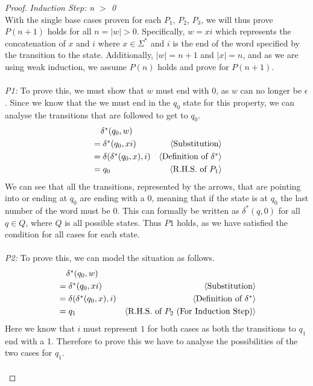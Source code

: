 \documentclass[11pt,fleqn]{article}
\newcommand{\mname}[1]{\mbox{\sf #1}}
\newcommand{\eps}{\epsilon}
\newcommand{\pnote}[1]{\langle \mbox{#1} \rangle}
\begin{document}
\begin{proof}
   \emph{Induction Step: n $>$ 0}\\
   With the single base cases proven for each $P_1$, $P_2$, $P_3$, we will thus prove $P(n+1)$ holds for all $n = |w| > 0$. Specifically, $w = xi$ which represents the concatenation of $x$ and $i$ where $x \in \Sigma^*$ and $i$ is the end of the word specified by the transition to the state. Additionally, $|w| = n + 1$ and $|x| = n$, and as we are using weak induction, we assume $P(n)$ holds and prove for $P(n+1)$. \\\\
   \emph{P1:}
   To prove this, we must show that $w$ must end with 0, as $w$ can no longer be $\eps$. Since we know that the we must end in the $q_0$ state for this property, we can analyse the transitions that are followed to get to $q_0$. 
   \begin{align*}
      &\phantom{{}=} \mname {$\delta^*(q_0, w)$}\\
      &= \mname{$\delta^*(q_0, xi)$} & \pnote{Substitution}\\
      &= \mname{$\delta(\delta^*(q_0, x), i)$} & \pnote{Definition of $\delta^*$}\\
      &= \mname{$q_0$} & \pnote{R.H.S. of $P_1$}
   \end{align*}
   We can see that all the transitions, represented by the arrows, that are pointing into or ending at $q_0$ are ending with a 0, meaning that if the state is at $q_0$ the last number of the word must be 0. This can formally be written as $\delta^*(q, 0)$ for all $q \in Q$, where $Q$ is all possible states. Thus $P1$ holds, as we have satisfied the condition for all cases for each state.
   \\\\
   \emph{P2:}
   To prove this, we can model the situation as follows.
   \begin{align*}
      &\phantom{{}=} \mname {$\delta^*(q_0, w)$}\\
      &= \mname{$\delta^*(q_0, xi)$}  & \pnote{Substitution}\\
      &= \mname{$\delta(\delta^*(q_0, x), i)$}  & \pnote{Definition of $\delta^*$}\\
      &= \mname{$q_1$} & \pnote{R.H.S. of $P_2$ (For Induction Step)}
   \end{align*}
   Here we know that $i$ must represent $1$ for both cases as both the transitions to $q_1$ end with a 1. Therefore to prove this we have to analyse the possibilities of the two cases for $q_1$.\\\\

\end{proof}
\end{document}
